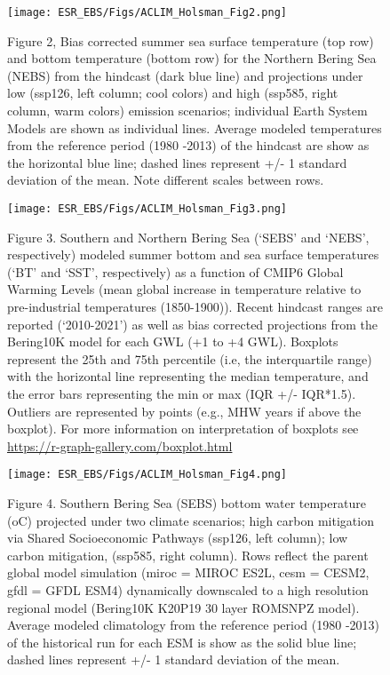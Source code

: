 \documentclass[
]{article}
\begin{document}
\begin{figure}
\centering
\texttt{[image: ESR\_EBS/Figs/ACLIM\_Holsman\_Fig2.png]}
\caption{Figure 2, Bias corrected summer sea surface temperature (top
row) and bottom temperature (bottom row) for the Northern Bering Sea
(NEBS) from the hindcast (dark blue line) and projections under low
(ssp126, left column; cool colors) and high (ssp585, right column, warm
colors) emission scenarios; individual Earth System Models are shown as
individual lines. Average modeled temperatures from the reference period
(1980 -2013) of the hindcast are show as the horizontal blue line;
dashed lines represent +/- 1 standard deviation of the mean. Note
different scales between rows.}
\end{figure}

\begin{figure}
\centering
\texttt{[image: ESR\_EBS/Figs/ACLIM\_Holsman\_Fig3.png]}
\caption{Figure 3. Southern and Northern Bering Sea (`SEBS' and `NEBS',
respectively) modeled summer bottom and sea surface temperatures (`BT'
and `SST', respectively) as a function of CMIP6 Global Warming Levels
(mean global increase in temperature relative to pre-industrial
temperatures (1850-1900)). Recent hindcast ranges are reported
(`2010-2021') as well as bias corrected projections from the Bering10K
model for each GWL (+1 to +4 GWL). Boxplots represent the 25th and 75th
percentile (i.e, the interquartile range) with the horizontal line
representing the median temperature, and the error bars representing the
min or max (IQR +/- IQR*1.5). Outliers are represented by points (e.g.,
MHW years if above the boxplot). For more information on interpretation
of boxplots see \url{https://r-graph-gallery.com/boxplot.html}}
\end{figure}

\begin{figure}
\centering
\texttt{[image: ESR\_EBS/Figs/ACLIM\_Holsman\_Fig4.png]}
\caption{Figure 4. Southern Bering Sea (SEBS) bottom water temperature
(oC) projected under two climate scenarios; high carbon mitigation via
Shared Socioeconomic Pathways (ssp126, left column); low carbon
mitigation, (ssp585, right column). Rows reflect the parent global model
simulation (miroc = MIROC ES2L, cesm = CESM2, gfdl = GFDL ESM4)
dynamically downscaled to a high resolution regional model (Bering10K
K20P19 30 layer ROMSNPZ model). Average modeled climatology from the
reference period (1980 -2013) of the historical run for each ESM is show
as the solid blue line; dashed lines represent +/- 1 standard deviation
of the mean.}
\end{figure}
\end{document}
